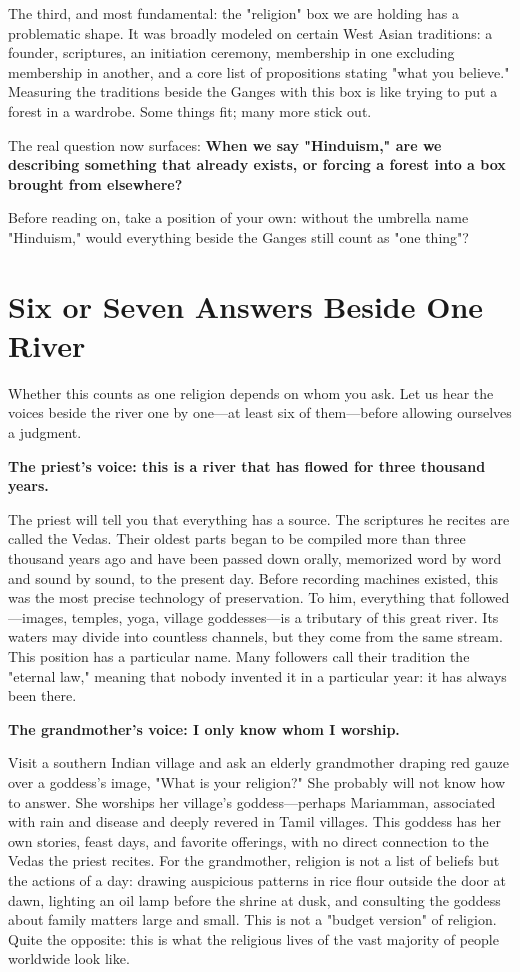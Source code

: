 The third, and most fundamental: the "religion" box we are holding has a problematic shape. It was broadly modeled on certain West Asian traditions: a founder, scriptures, an initiation ceremony, membership in one excluding membership in another, and a core list of propositions stating "what you believe." Measuring the traditions beside the Ganges with this box is like trying to put a forest in a wardrobe. Some things fit; many more stick out.

The real question now surfaces: \textbf{When we say "Hinduism," are we describing something that already exists, or forcing a forest into a box brought from elsewhere?}

Before reading on, take a position of your own: without the umbrella name "Hinduism," would everything beside the Ganges still count as "one thing"?

\section{Six or Seven Answers Beside One River}
Whether this counts as one religion depends on whom you ask. Let us hear the voices beside the river one by one---at least six of them---before allowing ourselves a judgment.

\textbf{The priest's voice: this is a river that has flowed for three thousand years.}

The priest will tell you that everything has a source. The scriptures he recites are called the Vedas. Their oldest parts began to be compiled more than three thousand years ago and have been passed down orally, memorized word by word and sound by sound, to the present day. Before recording machines existed, this was the most precise technology of preservation. To him, everything that followed---images, temples, yoga, village goddesses---is a tributary of this great river. Its waters may divide into countless channels, but they come from the same stream. This position has a particular name. Many followers call their tradition the "eternal law," meaning that nobody invented it in a particular year: it has always been there.

\textbf{The grandmother's voice: I only know whom I worship.}

Visit a southern Indian village and ask an elderly grandmother draping red gauze over a goddess's image, "What is your religion?" She probably will not know how to answer. She worships her village's goddess---perhaps Mariamman, associated with rain and disease and deeply revered in Tamil villages. This goddess has her own stories, feast days, and favorite offerings, with no direct connection to the Vedas the priest recites. For the grandmother, religion is not a list of beliefs but the actions of a day: drawing auspicious patterns in rice flour outside the door at dawn, lighting an oil lamp before the shrine at dusk, and consulting the goddess about family matters large and small. This is not a "budget version" of religion. Quite the opposite: this is what the religious lives of the vast majority of people worldwide look like.

